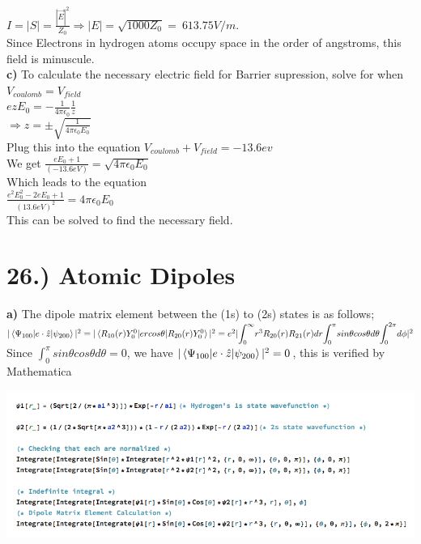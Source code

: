 \documentclass[10pt]{article}
\begin{document}
$I=|S|=\frac{|\vec{E}|^2}{Z_0}\Rightarrow |E|=\sqrt{1000Z_0}=~613.75 V/m$.\\

Since Electrons in hydrogen atoms occupy space in the order of angstroms, this field is minuscule. \\

\textbf{ c) } To calculate the necessary electric field for Barrier supression, solve for when $V_{coulomb}=V_{field}$\\

$ezE_0=-\frac{1}{4\pi\epsilon_0}\frac{1}{z}$\\

$\Rightarrow z=\pm\sqrt{\frac{1}{4\pi\epsilon_0E_0}}$\\

Plug this into the equation $V_{coulomb}+V_{field}=-13.6ev$\\

We get $\frac{eE_0+1}{(-13.6eV)}=\sqrt{4\pi\epsilon_0E_0}$\\

Which leads to the equation \\

$\frac{e^2 E_0^2-2eE_0+1}{(13.6eV)^2}=4\pi\epsilon_0 E_0$\\

This can be solved to find the necessary field.\\


\section*{26.) Atomic Dipoles}

\textbf{a)} The dipole matrix element between the (1s) to (2s) states is as follows; \\

$|\braket{\Psi_{100}|e\cdot\hat{z}|\psi_{200}}|^2=|\braket{R_{10}(r)Y_0^0|ercos\theta|R_{20}(r)Y_0^0}|^2=e^2|{\displaystyle\int_0^\infty}r^3R_{20}(r)R_{21}(r)dr{\displaystyle\int_0^\pi}sin\theta cos\theta d\theta {\displaystyle\int_0^{2\pi}}d\phi|^2$\\

Since $ {\displaystyle\int_0^\pi}sin\theta cos\theta d\theta=0$, we have $|\braket{\Psi_{100}|e\cdot\hat{z}|\psi_{200}}|^2=0$, this is verified by Mathematica\\

\begin{center}
    \includegraphics[width=0.9\linewidth]{26a.png}
\end{center}
\end{document}
